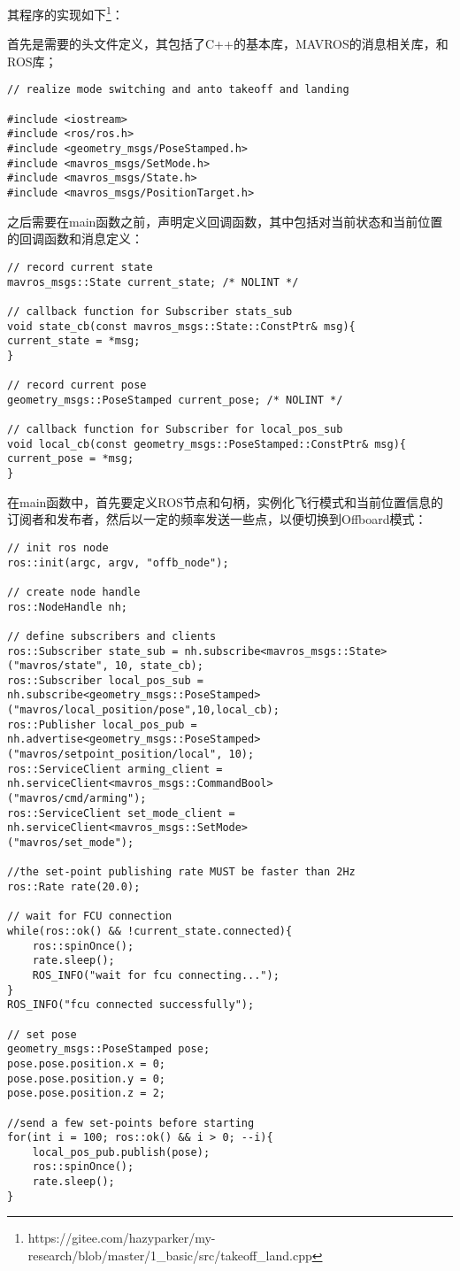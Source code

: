 其程序的实现如下\footnote[1]{https://gitee.com/hazyparker/my-research/blob/master/1\_basic/src/takeoff\_land.cpp}：

首先是需要的头文件定义，其包括了C++的基本库，MAVROS的消息相关库，和ROS库；

\begin{verbatim}
// realize mode switching and anto takeoff and landing

#include <iostream>
#include <ros/ros.h>
#include <geometry_msgs/PoseStamped.h>
#include <mavros_msgs/SetMode.h>
#include <mavros_msgs/State.h>
#include <mavros_msgs/PositionTarget.h>
\end{verbatim}

之后需要在main函数之前，声明定义回调函数，其中包括对当前状态和当前位置的回调函数和消息定义：
\begin{verbatim}
// record current state
mavros_msgs::State current_state; /* NOLINT */

// callback function for Subscriber stats_sub
void state_cb(const mavros_msgs::State::ConstPtr& msg){
current_state = *msg;
}

// record current pose
geometry_msgs::PoseStamped current_pose; /* NOLINT */

// callback function for Subscriber for local_pos_sub
void local_cb(const geometry_msgs::PoseStamped::ConstPtr& msg){
current_pose = *msg;
}
\end{verbatim}

在main函数中，首先要定义ROS节点和句柄，实例化飞行模式和当前位置信息的订阅者和发布者，然后以一定的频率发送一些点，以便切换到Offboard模式：
\begin{verbatim}
// init ros node
ros::init(argc, argv, "offb_node");

// create node handle
ros::NodeHandle nh;

// define subscribers and clients
ros::Subscriber state_sub = nh.subscribe<mavros_msgs::State>
("mavros/state", 10, state_cb);
ros::Subscriber local_pos_sub = nh.subscribe<geometry_msgs::PoseStamped>
("mavros/local_position/pose",10,local_cb);
ros::Publisher local_pos_pub = nh.advertise<geometry_msgs::PoseStamped>
("mavros/setpoint_position/local", 10);
ros::ServiceClient arming_client = nh.serviceClient<mavros_msgs::CommandBool>
("mavros/cmd/arming");
ros::ServiceClient set_mode_client = nh.serviceClient<mavros_msgs::SetMode>
("mavros/set_mode");

//the set-point publishing rate MUST be faster than 2Hz
ros::Rate rate(20.0);

// wait for FCU connection
while(ros::ok() && !current_state.connected){
    ros::spinOnce();
    rate.sleep();
    ROS_INFO("wait for fcu connecting...");
}
ROS_INFO("fcu connected successfully");

// set pose
geometry_msgs::PoseStamped pose;
pose.pose.position.x = 0;
pose.pose.position.y = 0;
pose.pose.position.z = 2;

//send a few set-points before starting
for(int i = 100; ros::ok() && i > 0; --i){
    local_pos_pub.publish(pose);
    ros::spinOnce();
    rate.sleep();
}
\end{verbatim}

